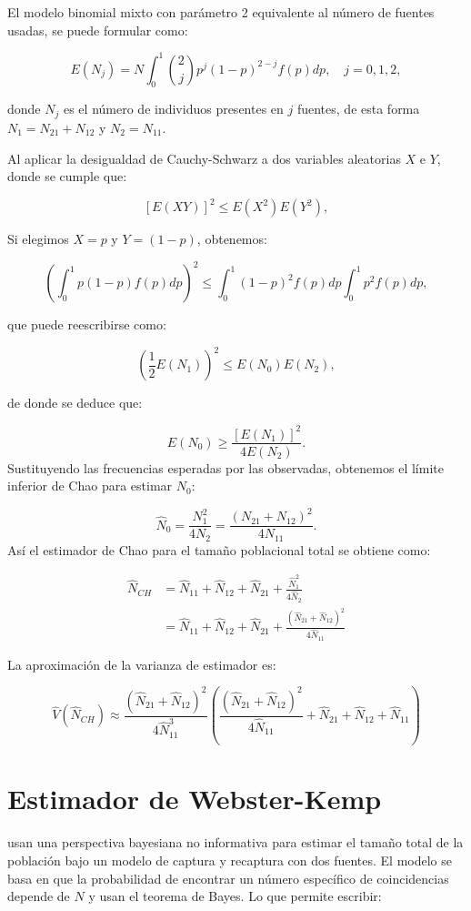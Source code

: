 \documentclass[
  12pt,
]{book}
\begin{document}
El modelo binomial mixto con parámetro 2 equivalente al número de fuentes usadas, se puede formular como:

\[E(N_j) = N \int_0^1 \binom{2}{j} p^j (1-p)^{2-j} f(p) dp, \quad j = 0, 1, 2,\]

donde \(N_j\) es el número de individuos presentes en \(j\) fuentes, de esta forma \(N_1 = N_{21} + N_{12}\) y \(N_2 = N_{11}\).

Al aplicar la desigualdad de Cauchy-Schwarz a dos variables aleatorias \(X\) e \(Y\), donde se cumple que:

\[[E(XY)]^2 \leq E(X^2)E(Y^2),\]

Si elegimos \(X = p\) y \(Y = (1-p)\), obtenemos:

\[\left(\int_0^1 p(1-p)f(p) dp\right)^2 \leq \int_0^1 (1-p)^2 f(p)dp \int_0^1 p^2 f(p)dp,\]

que puede reescribirse como:

\[\left(\frac{1}{2}E(N_1)\right)^2 \leq E(N_0)E(N_2),\]

de donde se deduce que:

\[E(N_0) \geq \frac{\left[E(N_1)\right]^2}{4E(N_2)}.\]
Sustituyendo las frecuencias esperadas por las observadas, obtenemos el límite inferior de Chao para estimar \(N_0\):

\[\hat{N}_0 =  \frac{N_{1}^2}{4N_{2}} = \frac{(N_{21}+N_{12})^2}{4N_{11}}.\]
Así el estimador de Chao para el tamaño poblacional total se obtiene como:

\begin{align}
\hat{N}_{CH} &= \hat{N}_{11} + \hat{N}_{12} + \hat{N}_{21} + \frac{\hat{N}_{1}^2}{4\hat{N}_{2}}\\
             &= \hat{N}_{11} + \hat{N}_{12} + \hat{N}_{21} + \frac{(\hat{N}_{21}+\hat{N}_{12})^2}{4\hat{N}_{11}}
\end{align}

La aproximación de la varianza de estimador es:

\[
\hat{V}(\hat{N}_{CH}) \approx \frac{(\hat{N}_{21}+\hat{N}_{12
})^2}{4\hat{N}_{11}^3} \left( \frac{(\hat{N}_{21}+\hat{N}_{12})^2}{4\hat{N}_{11}} + \hat{N}_{21}+\hat{N}_{12} + \hat{N}_{11} \right)\]

\section{Estimador de Webster-Kemp}\label{estimador-de-webster-kemp}

\citet{webster2013estimating} usan una perspectiva bayesiana no informativa para estimar el tamaño total de la población bajo un modelo de captura y recaptura con dos fuentes. El modelo se basa en que la probabilidad de encontrar un número específico de coincidencias depende de \(N\) y usan el teorema de Bayes. Lo que permite escribir:
\end{document}
